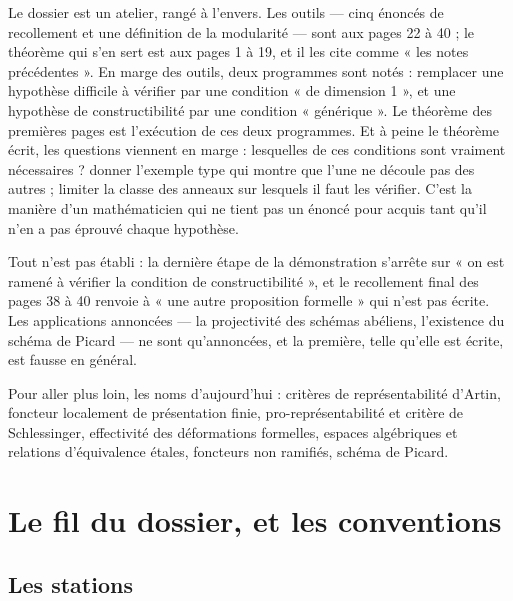 \documentclass[11pt,a4paper]{article}
\begin{document}
\begin{resume}
Le dossier est un atelier, rangé à l'envers. Les outils — cinq énoncés de
recollement et une définition de la modularité — sont aux pages 22 à 40 ; le
théorème qui s'en sert est aux pages 1 à 19, et il les cite comme « les notes
précédentes ». En marge des outils, deux programmes sont notés : remplacer une
hypothèse difficile à vérifier par une condition « de dimension 1 », et une
hypothèse de constructibilité par une condition « générique ». Le théorème des
premières pages est l'exécution de ces deux programmes. Et à peine le
théorème écrit, les questions viennent en marge : lesquelles de ces conditions
sont vraiment nécessaires ? donner l'exemple type qui montre que l'une ne
découle pas des autres ; limiter la classe des anneaux sur lesquels il faut
les vérifier. C'est la manière d'un mathématicien qui ne tient pas un énoncé
pour acquis tant qu'il n'en a pas éprouvé chaque hypothèse.

Tout n'est pas établi : la dernière étape de la démonstration s'arrête sur
« on est ramené à vérifier la condition de constructibilité », et le
recollement final des pages 38 à 40 renvoie à « une autre proposition
formelle » qui n'est pas écrite. Les applications annoncées — la projectivité
des schémas abéliens, l'existence du schéma de Picard — ne sont qu'annoncées,
et la première, telle qu'elle est écrite, est fausse en général.

Pour aller plus loin, les noms d'aujourd'hui : critères de représentabilité
d'Artin, foncteur localement de présentation finie, pro-représentabilité et
critère de Schlessinger, effectivité des déformations formelles, espaces
algébriques et relations d'équivalence étales, foncteurs non ramifiés, schéma
de Picard.

\end{resume}

\section*{Le fil du dossier, et les conventions}

\subsection*{Les stations}
\end{document}
